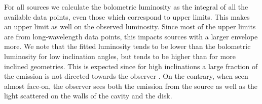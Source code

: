 For all sources we calculate the bolometric luminosity as the integral of all the available data points, even those which correspond to upper limits. This makes \Lbol an upper limit as well on the observed luminosity. Since most of the upper limits are from long-wavelength data points, this impacts sources with a larger envelope more. We note that the fitted luminosity \Lmod tends to be lower than the bolometric luminosity \Lbol for low inclination angles, but \Lmod tends to be higher than \Lbol for more inclined geometries. This is expected since for high inclinations a large fraction of the emission is not directed towards the observer \citep[see, e.g.][for a discussion]{Furlan:2016df}. On the contrary, when seen almost face-on, the observer sees both the emission from the source as well as the light scattered on the walls of the cavity and the disk.







